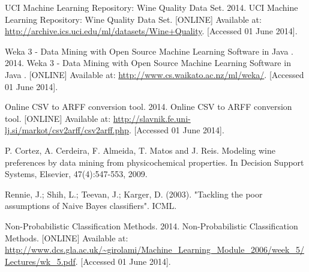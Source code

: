 \documentclass[a4paper,12pt,openany]{report}
\begin{document}
\begin{thebibliography}{10}
	UCI Machine Learning Repository: Wine Quality Data Set. 2014. UCI Machine Learning Repository: Wine Quality Data Set. [ONLINE] Available at: \url{http://archive.ics.uci.edu/ml/datasets/Wine+Quality}. [Accessed 01 June 2014].

	Weka 3 - Data Mining with Open Source Machine Learning Software in Java . 2014. Weka 3 - Data Mining with Open Source Machine Learning Software in Java . [ONLINE] Available at: \url{http://www.cs.waikato.ac.nz/ml/weka/}. [Accessed 01 June 2014].

	Online CSV to ARFF conversion tool. 2014. Online CSV to ARFF conversion tool. [ONLINE] Available at: \url{http://slavnik.fe.uni-lj.si/markot/csv2arff/csv2arff.php}. [Accessed 01 June 2014].

	P. Cortez, A. Cerdeira, F. Almeida, T. Matos and J. Reis. Modeling wine preferences by data mining from physicochemical properties. In Decision Support Systems, Elsevier, 47(4):547-553, 2009.

	Rennie, J.; Shih, L.; Teevan, J.; Karger, D. (2003). "Tackling the poor assumptions of Naive Bayes classifiers". ICML.

Non-Probabilistic Classiﬁcation Methods. 2014. Non-Probabilistic Classiﬁcation Methods. [ONLINE] Available at: \url{http://www.dcs.gla.ac.uk/~girolami/Machine_Learning_Module_2006/week_5/Lectures/wk_5.pdf}. [Accessed 01 June 2014].

\end{thebibliography}
\end{document}
